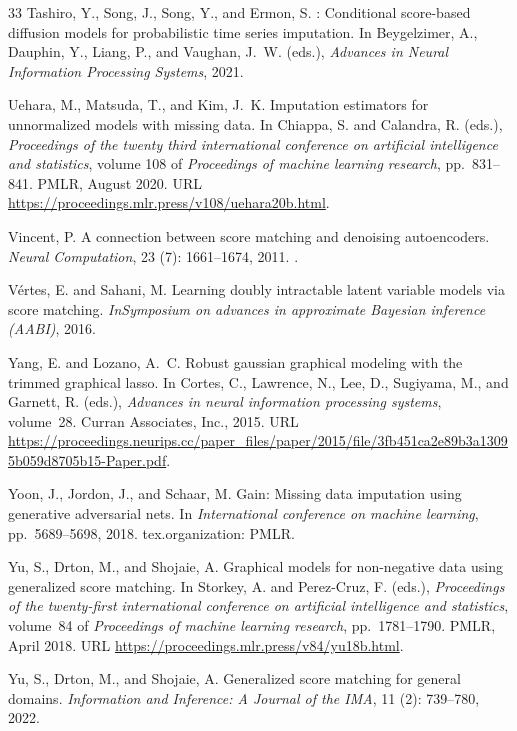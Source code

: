 \documentclass{article} %
\begin{document}
\begin{thebibliography}{33}
Tashiro, Y., Song, J., Song, Y., and Ermon, S.
: {{Conditional}} score-based diffusion models for probabilistic time series imputation.
\newblock In Beygelzimer, A., Dauphin, Y., Liang, P., and Vaughan, J.~W. (eds.), \emph{Advances in Neural Information Processing Systems}, 2021.

Uehara, M., Matsuda, T., and Kim, J.~K.
\newblock Imputation estimators for unnormalized models with missing data.
\newblock In Chiappa, S. and Calandra, R. (eds.), \emph{Proceedings of the twenty third international conference on artificial intelligence and statistics}, volume 108 of \emph{Proceedings of machine learning research}, pp.\  831--841. PMLR, August 2020.
\newblock URL \url{https://proceedings.mlr.press/v108/uehara20b.html}.

Vincent, P.
\newblock A connection between score matching and denoising autoencoders.
\newblock \emph{Neural Computation}, 23 (7): 1661--1674, 2011.
\newblock {}.

Vértes, E. and Sahani, M.
\newblock Learning doubly intractable latent variable models via score matching.
\newblock \emph{InSymposium on advances in approximate Bayesian inference (AABI)}, 2016.

Yang, E. and Lozano, A.~C.
\newblock Robust gaussian graphical modeling with the trimmed graphical lasso.
\newblock In Cortes, C., Lawrence, N., Lee, D., Sugiyama, M., and Garnett, R. (eds.), \emph{Advances in neural information processing systems}, volume~28. Curran Associates, Inc., 2015.
\newblock URL \url{https://proceedings.neurips.cc/paper_files/paper/2015/file/3fb451ca2e89b3a13095b059d8705b15-Paper.pdf}.

Yoon, J., Jordon, J., and Schaar, M.
\newblock Gain: {Missing} data imputation using generative adversarial nets.
\newblock In \emph{International conference on machine learning}, pp.\  5689--5698, 2018.
\newblock tex.organization: PMLR.

Yu, S., Drton, M., and Shojaie, A.
\newblock Graphical models for non-negative data using generalized score matching.
\newblock In Storkey, A. and Perez-Cruz, F. (eds.), \emph{Proceedings of the twenty-first international conference on artificial intelligence and statistics}, volume~84 of \emph{Proceedings of machine learning research}, pp.\  1781--1790. PMLR, April 2018.
\newblock URL \url{https://proceedings.mlr.press/v84/yu18b.html}.

Yu, S., Drton, M., and Shojaie, A.
\newblock Generalized score matching for general domains.
\newblock \emph{Information and Inference: A Journal of the IMA}, 11 (2): 739--780, 2022.

\end{thebibliography}
\end{document}
